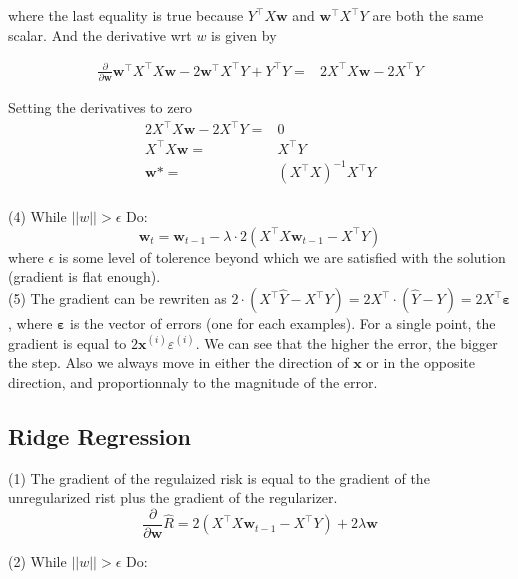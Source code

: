 \documentclass[11pt,english]{article}
\newcommand{\pd}[1]{\frac{\partial}{\partial {#1}}}
\begin{document}
    where the last equality is true because $Y^\top X\bm{w}$ and $\bm{w}^\top X^\top Y$ are both the same scalar. And the derivative wrt $w$ is given by

    \begin{equation}
        \begin{split}
            \pd{\bm{w}} \bm{w}^\top X^\top X\bm{w} - 2\bm{w}^\top X^\top Y  + Y^\top Y
            =& 2X^\top X\bm{w} - 2 X^\top Y 
        \end{split}
    \end{equation}

    Setting the derivatives to zero
    \begin{equation}
        \begin{split}
            2X^\top X\bm{w} - 2 X^\top Y =& 0 \\
            X^\top X\bm{w}  =& X^\top Y \\
            \bm{w}*  =& (X^\top X)^{-1} X^\top Y \\
        \end{split}
    \end{equation}

    (4) While $||w||>\epsilon$ Do:
    $$
        \bm{w}_t = \bm{w}_{t-1} - \lambda \cdot 2(X^\top X\bm{w}_{t-1} - X^\top Y)
    $$
    where $\epsilon$ is some level of tolerence beyond which we are satisfied with the solution (gradient is flat enough).\\

    (5) The gradient can be rewriten as $2\cdot (X^\top \hat{Y} - X^\top Y)=2X^\top\cdot (\hat{Y} - Y)=2X^\top \bm{\varepsilon}$, where $\bm{\varepsilon}$ is the vector of errors (one for each examples). For a single point, the gradient is equal to $2\bm{x}^{(i)}\varepsilon^{(i)}$. We can see that the higher the error, the bigger the step. Also we always move in either the direction of $\bm{x}$ or in the opposite direction, and proportionnaly to the magnitude of the error.
    
    \subsection{Ridge Regression}

    (1) The gradient of the regulaized risk is equal to the gradient of the unregularized rist plus the gradient of the regularizer.
    \[
        \pd{\bm{w}} \hat{R} = 2(X^\top X\bm{w}_{t-1} - X^\top Y) + 2 \lambda \bm{w}
    \]

    (2) While $||w||>\epsilon$ Do:
\end{document}
